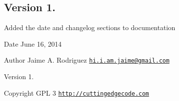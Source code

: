 \subsection*{Version 1.}


\begin{DoxyItemize}
\item Added the date and changelog sections to documentation
\end{DoxyItemize}

\begin{DoxyDate}{Date}
June 16, 2014 
\end{DoxyDate}
\begin{DoxyAuthor}{Author}
Jaime A. Rodriguez \href{mailto:hi.i.am.jaime@gmail.com}{\tt hi.\-i.\-am.\-jaime@gmail.\-com} 
\end{DoxyAuthor}
\begin{DoxyVersion}{Version}
1. 
\end{DoxyVersion}
\begin{DoxyCopyright}{Copyright}
G\-P\-L 3 \href{http://cuttingedgecode.com}{\tt http\-://cuttingedgecode.\-com} 
\end{DoxyCopyright}
